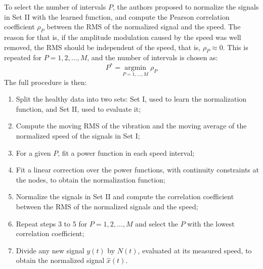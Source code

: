 To select the number of intervals $P$, the authors proposed to normalize the signals in Set II with the learned function, and  compute the Pearson correlation coefficient $\rho_P$ between the RMS of the normalized signal and the speed. The reason for that is, if the amplitude modulation caused by the speed was well removed, the RMS should be independent of the speed, that is, $\rho_P \approx 0$. This is repeated for $P = 1, 2, \dots, M$, and the number of intervals is chosen as:
\begin{equation}
    P^* = \underset{P = 1, \dots, M}{\text{argmin}} \; \rho_P
\end{equation}
The full procedure is then:
\begin{enumerate}
    \item Split the healthy data into two sets: Set I, used to learn the normalization function, and Set II, used to evaluate it;
    \item Compute the moving RMS of the vibration and the moving average of the normalized speed of the signals in Set I;
    \item For a given $P$, fit a power function in each speed interval;
    \item Fit a linear correction over the power functions, with continuity constraints at the nodes, to obtain the normalization function;
    \item Normalize the signals in Set II and compute the correlation coefficient between the RMS of the normalized signals and the speed;
    \item Repeat steps 3 to 5 for $P = 1, 2, \dots, M$ and select the $P$ with the lowest correlation coefficient;
    \item Divide any new signal $y(t)$ by $N(t)$, evaluated at its measured speed, to obtain the normalized signal $\hat{x}(t)$.
\end{enumerate}

